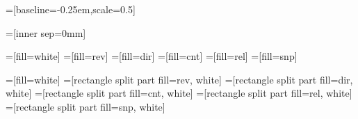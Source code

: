 \usetikzlibrary{arrows.meta}
\usetikzlibrary{arrows}
\usetikzlibrary{backgrounds}
\usetikzlibrary{decorations.pathreplacing}
\usetikzlibrary{matrix}
\usetikzlibrary{patterns}
\usetikzlibrary{positioning}
\usetikzlibrary{shapes,shapes.geometric,shapes.misc}
\usetikzlibrary{shadows}







{}=[baseline=-0.25em,scale=0.5]



=[inner sep=0mm]

=[fill=white]
=[fill=rev]
=[fill=dir]
=[fill=cnt]
=[fill=rel]
=[fill=snp]

=[fill=white]
=[rectangle split part fill={rev, white}]
=[rectangle split part fill={dir, white}]
=[rectangle split part fill={cnt, white}]
=[rectangle split part fill={rel, white}]
=[rectangle split part fill={snp, white}]

\newcommand{\umlobj}[4][]{
    \node[rectangle split, rectangle split parts=2, draw, align=center, text
        centered, inner sep=1.5ex, #1]
        (#3) {$\ll$#2$\gg$ \\ \textbf{#3} \nodepart[align=left]{second} #4};
}
\newcommand{\umlsimpleobj}[3][]{
    \node[draw, align=center, text centered, inner sep=1.5ex, #1]
        (#3) {$\ll$#2$\gg$ \\ \textbf{#3}};
}
